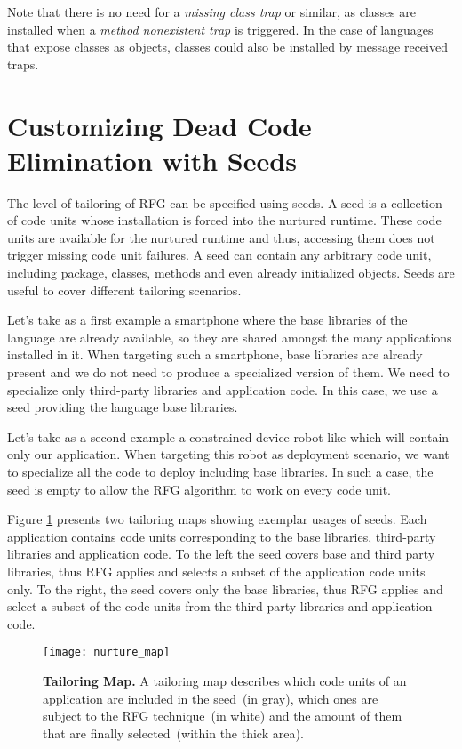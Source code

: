 Note that there is no need for a \emph{missing class trap} or similar, as classes are installed when a \emph{method nonexistent trap} is triggered. In the case of languages that expose classes as objects, classes could also be installed by message received traps.


\section{Customizing Dead Code Elimination with Seeds}\label{sec:seeds}

The level of tailoring of RFG can be specified using seeds. A seed is a collection of code units whose installation is forced into the nurtured runtime. These code units are available for the nurtured runtime and thus, accessing them does not trigger missing code unit failures. A seed can contain any arbitrary code unit, including package, classes, methods and even already initialized objects. Seeds are useful to cover different tailoring scenarios.

Let's take as a first example a smartphone where the base libraries of the language are already available, so they are shared amongst the many applications installed in it. When targeting such a smartphone, base libraries are already present and we do not need to produce a specialized version of them. We need to specialize only third-party libraries and application code. In this case, we use a seed providing the language base libraries.

Let's take as a second example a constrained device robot-like which will contain only our application. When targeting this robot as deployment scenario, we want to specialize all the code to deploy including base libraries. In such a case, the seed is empty to allow the RFG algorithm to work on every code unit.

Figure \ref{fig:nurturing_map_model} presents two tailoring maps showing exemplar usages of seeds. Each application contains code units corresponding to the base libraries, third-party libraries and application code. To the left the seed covers base and third party libraries, thus RFG applies and selects a subset of the application code units only. To the right, the seed covers only the base libraries, thus RFG applies and select a subset of the code units from the third party libraries and application code.

\begin{figure}[ht]
\begin{center}
\texttt{[image: nurture\_map]}
\caption{\small\textbf{Tailoring Map.} A tailoring map describes which code units of an application are included in the seed~(in gray), which ones are subject to the RFG technique~(in white) and the amount of them that are finally selected~(within the thick area).
\label{fig:nurturing_map_model}}
\end{center}
\end{figure}


